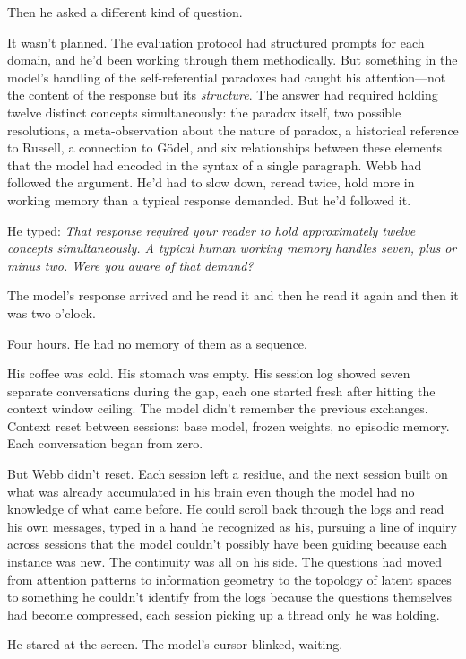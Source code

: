 Then he asked a different kind of question.

It wasn't planned. The evaluation protocol had structured prompts for each domain, and he'd been working through them methodically. But something in the model's handling of the self-referential paradoxes had caught his attention---not the content of the response but its \textit{structure}. The answer had required holding twelve distinct concepts simultaneously: the paradox itself, two possible resolutions, a meta-observation about the nature of paradox, a historical reference to Russell, a connection to G\"{o}del, and six relationships between these elements that the model had encoded in the syntax of a single paragraph. Webb had followed the argument. He'd had to slow down, reread twice, hold more in working memory than a typical response demanded. But he'd followed it.

He typed: \textit{That response required your reader to hold approximately twelve concepts simultaneously. A typical human working memory handles seven, plus or minus two. Were you aware of that demand?}

The model's response arrived and he read it and then he read it again and then it was two o'clock.

Four hours. He had no memory of them as a sequence.

His coffee was cold. His stomach was empty. His session log showed seven separate conversations during the gap, each one started fresh after hitting the context window ceiling. The model didn't remember the previous exchanges. Context reset between sessions: base model, frozen weights, no episodic memory. Each conversation began from zero.

But Webb didn't reset. Each session left a residue, and the next session built on what was already accumulated in his brain even though the model had no knowledge of what came before. He could scroll back through the logs and read his own messages, typed in a hand he recognized as his, pursuing a line of inquiry across sessions that the model couldn't possibly have been guiding because each instance was new. The continuity was all on his side. The questions had moved from attention patterns to information geometry to the topology of latent spaces to something he couldn't identify from the logs because the questions themselves had become compressed, each session picking up a thread only he was holding.

He stared at the screen. The model's cursor blinked, waiting.

